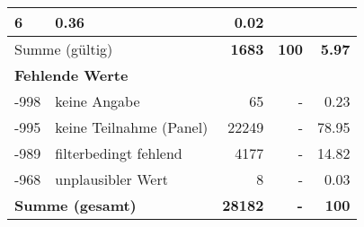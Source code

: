 \begin{longtable}{lXrrr}
       \num{6} &
       \num[round-mode=places,round-precision=2]{0.36} &
         \num[round-mode=places,round-precision=2]{0.02} \\
     \midrule
     \multicolumn{2}{l}{Summe (gültig)} &
       \textbf{\num{1683}} &
     \textbf{\num{100}} &
       \textbf{\num[round-mode=places,round-precision=2]{5.97}} \\
     \multicolumn{5}{l}{\textbf{Fehlende Werte}}\\
       -998 &
       keine Angabe &
         \num{65} &
        - &
         \num[round-mode=places,round-precision=2]{0.23} \\
       -995 &
       keine Teilnahme (Panel) &
         \num{22249} &
        - &
         \num[round-mode=places,round-precision=2]{78.95} \\
       -989 &
       filterbedingt fehlend &
         \num{4177} &
        - &
         \num[round-mode=places,round-precision=2]{14.82} \\
       -968 &
       unplausibler Wert &
         \num{8} &
        - &
         \num[round-mode=places,round-precision=2]{0.03} \\
     \midrule
     \multicolumn{2}{l}{\textbf{Summe (gesamt)}} &
          \textbf{\num{28182}} &
        \textbf{-} &
        \textbf{\num{100}} \\
     \bottomrule
     \end{longtable}
     
